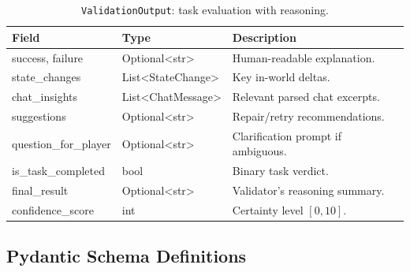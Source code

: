 \begin{table}[!htbp]
  \centering
  \caption{\texttt{ValidationOutput}: task evaluation with reasoning.}
  \label{tab:validation}
  \begin{tabularx}{\linewidth}{@{} l l X @{}}
    \toprule
    \textbf{Field} & \textbf{Type} & \textbf{Description} \\
    \midrule
    success, failure & Optional\textless{}str\textgreater{} & Human-readable explanation. \\
    state\_changes & List\textless{}StateChange\textgreater{} & Key in-world deltas. \\
    chat\_insights & List\textless{}ChatMessage\textgreater{} & Relevant parsed chat excerpts. \\
    suggestions & Optional\textless{}str\textgreater{} & Repair/retry recommendations. \\
    question\_for\_player & Optional\textless{}str\textgreater{} & Clarification prompt if ambiguous. \\
    is\_task\_completed & bool & Binary task verdict. \\
    final\_result & Optional\textless{}str\textgreater{} & Validator's reasoning summary. \\
    confidence\_score & int & Certainty level \([0,10]\). \\
    \bottomrule
  \end{tabularx}
\end{table}

\FloatBarrier
\vspace{10pt}

\newpage
\subsection{Pydantic Schema Definitions}
\label{app:pydantic}
\vspace{4pt}
\FloatBarrier

